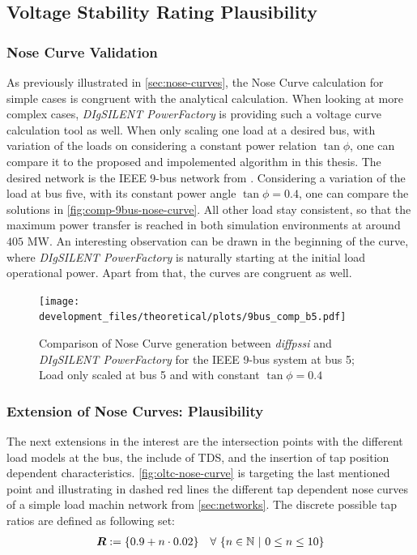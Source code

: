 \subsection{Voltage Stability Rating Plausibility}

\subsubsection{Nose Curve Validation}

As previously illustrated in \autoref{sec:nose-curves}, the Nose Curve calculation for simple cases is congruent with the analytical calculation.
When looking at more complex cases, \textit{DIgSILENT PowerFactory} is providing such a voltage curve calculation tool as well.
When only scaling one load at a desired bus, with variation of the loads on considering a constant power relation $\tan \phi$, one can compare it to the proposed and impolemented algorithm in this thesis.
The desired network is the IEEE 9-bus network from \quelle.
Considering a variation of the load at bus five, with its constant power angle $\tan \phi = 0.4$, one can compare the solutions in \autoref{fig:comp-9bus-nose-curve}.
All other load stay consistent, so that the maximum power transfer is reached in both simulation environments at around $405$ MW.
An interesting observation can be drawn in the beginning of the curve, where \textit{DIgSILENT PowerFactory} is naturally starting at the initial load operational power.
Apart from that, the curves are congruent as well.

\begin{figure}[htbp!]
    \centering
    \texttt{[image: development\_files/theoretical/plots/9bus\_comp\_b5.pdf]}
    \caption[Comparison of Nose Curve generation between \textit{diffpssi} and \textit{DIgSILENT PowerFactory} for the IEEE 9-bus system]{Comparison of Nose Curve generation between \textit{diffpssi} and \textit{DIgSILENT PowerFactory} for the IEEE 9-bus system at bus 5; Load only scaled at bus 5 and with constant $\tan \phi = 0.4$}
    \label{fig:comp-9bus-nose-curve}
\end{figure}

\subsubsection{Extension of Nose Curves: Plausibility}

The next extensions in the interest are the intersection points with the different load models at the bus, the include of \acs{TDS}, and the insertion of tap position dependent characteristics.
\autoref{fig:oltc-nose-curve} is targeting the last mentioned point and illustrating in dashed red lines the different tap dependent nose curves of a simple load machin network from \autoref{sec:networks}.
The discrete possible tap ratios are defined as following set:
\begin{align}
    \boldsymbol{R} := \{0.9 + n \cdot 0.02\} \quad \forall~\{ n \in \mathbb{N}~\vert~0 \leq n \leq 10 \} \notag
\end{align}

